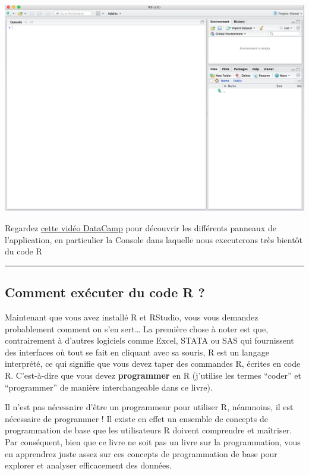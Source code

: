 \documentclass[a4paperpaper,]{article}
\theoremstyle{definition}
\theoremstyle{definition}
\theoremstyle{definition}
\theoremstyle{remark}
\begin{document}
\includegraphics{images/rstudio.png}

Regardez
\href{https://campus.datacamp.com/courses/working-with-the-rstudio-ide-part-1/orientation?ex=5}{cette
vidéo DataCamp} pour découvrir les différents panneaux de l'application,
en particulier la Console dans laquelle nous executerons très bientôt du
code R

\begin{center}\rule{0.5\linewidth}{\linethickness}\end{center}

\hypertarget{code}{%
\subsection{Comment exécuter du code R ?}\label{code}}

Maintenant que vous avez installé R et RStudio, vous vous demandez
probablement comment on s'en sert\ldots{} La première chose à noter est
que, contrairement à d'autres logiciels comme Excel, STATA ou SAS qui
fournissent des interfaces où tout se fait en cliquant avec sa souris, R
est un langage interprété, ce qui signifie que vous devez taper des
commandes R, écrites en code R. C'est-à-dire que vous devez
\textbf{programmer} en R (j'utilise les termes ``coder'' et
``programmer'' de manière interchangeable dans ce livre).

Il n'est pas nécessaire d'être un programmeur pour utiliser R,
néamnoins, il est nécessaire de programmer ! Il existe en effet un
ensemble de concepts de programmation de base que les utilisateurs R
doivent comprendre et maîtriser. Par conséquent, bien que ce livre ne
soit pas un livre sur la programmation, vous en apprendrez juste assez
sur ces concepts de programmation de base pour explorer et analyser
efficacement des données.
\end{document}
